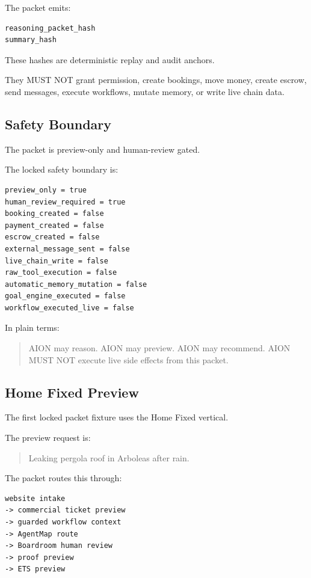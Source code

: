 The packet emits:

\begin{verbatim}
reasoning_packet_hash
summary_hash
\end{verbatim}

These hashes are deterministic replay and audit anchors.

They MUST NOT grant permission, create bookings, move money, create escrow, send messages, execute workflows, mutate memory, or write live chain data.

\subsection{Safety Boundary}

The packet is preview-only and human-review gated.

The locked safety boundary is:

\begin{verbatim}
preview_only = true
human_review_required = true
booking_created = false
payment_created = false
escrow_created = false
external_message_sent = false
live_chain_write = false
raw_tool_execution = false
automatic_memory_mutation = false
goal_engine_executed = false
workflow_executed_live = false
\end{verbatim}

In plain terms:

\begin{quote}
AION may reason. AION may preview. AION may recommend. AION MUST NOT execute live side effects from this packet.
\end{quote}

\subsection{Home Fixed Preview}

The first locked packet fixture uses the Home Fixed vertical.

The preview request is:

\begin{quote}
Leaking pergola roof in Arboleas after rain.
\end{quote}

The packet routes this through:

\begin{verbatim}
website intake
-> commercial ticket preview
-> guarded workflow context
-> AgentMap route
-> Boardroom human review
-> proof preview
-> ETS preview
\end{verbatim}


